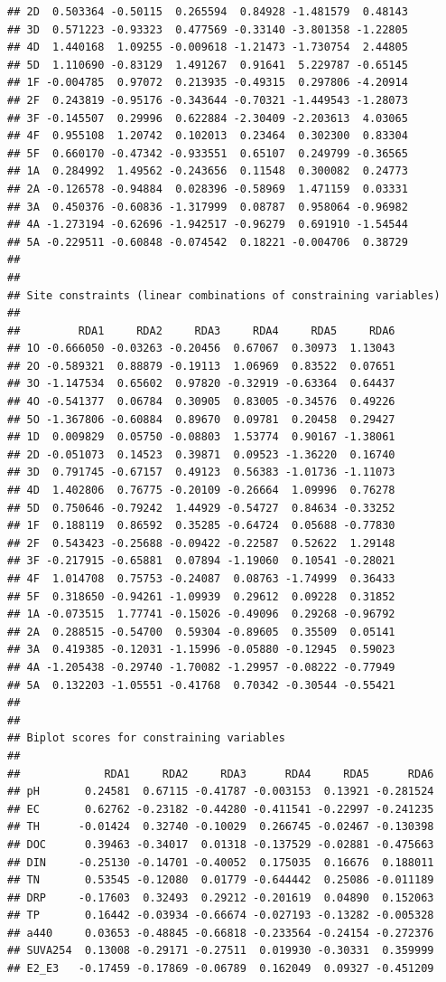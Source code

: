 \documentclass[
]{book}
\begin{document}
\begin{verbatim}
## 2D  0.503364 -0.50115  0.265594  0.84928 -1.481579  0.48143
## 3D  0.571223 -0.93323  0.477569 -0.33140 -3.801358 -1.22805
## 4D  1.440168  1.09255 -0.009618 -1.21473 -1.730754  2.44805
## 5D  1.110690 -0.83129  1.491267  0.91641  5.229787 -0.65145
## 1F -0.004785  0.97072  0.213935 -0.49315  0.297806 -4.20914
## 2F  0.243819 -0.95176 -0.343644 -0.70321 -1.449543 -1.28073
## 3F -0.145507  0.29996  0.622884 -2.30409 -2.203613  4.03065
## 4F  0.955108  1.20742  0.102013  0.23464  0.302300  0.83304
## 5F  0.660170 -0.47342 -0.933551  0.65107  0.249799 -0.36565
## 1A  0.284992  1.49562 -0.243656  0.11548  0.300082  0.24773
## 2A -0.126578 -0.94884  0.028396 -0.58969  1.471159  0.03331
## 3A  0.450376 -0.60836 -1.317999  0.08787  0.958064 -0.96982
## 4A -1.273194 -0.62696 -1.942517 -0.96279  0.691910 -1.54544
## 5A -0.229511 -0.60848 -0.074542  0.18221 -0.004706  0.38729
## 
## 
## Site constraints (linear combinations of constraining variables)
## 
##         RDA1     RDA2     RDA3     RDA4     RDA5     RDA6
## 1O -0.666050 -0.03263 -0.20456  0.67067  0.30973  1.13043
## 2O -0.589321  0.88879 -0.19113  1.06969  0.83522  0.07651
## 3O -1.147534  0.65602  0.97820 -0.32919 -0.63364  0.64437
## 4O -0.541377  0.06784  0.30905  0.83005 -0.34576  0.49226
## 5O -1.367806 -0.60884  0.89670  0.09781  0.20458  0.29427
## 1D  0.009829  0.05750 -0.08803  1.53774  0.90167 -1.38061
## 2D -0.051073  0.14523  0.39871  0.09523 -1.36220  0.16740
## 3D  0.791745 -0.67157  0.49123  0.56383 -1.01736 -1.11073
## 4D  1.402806  0.76775 -0.20109 -0.26664  1.09996  0.76278
## 5D  0.750646 -0.79242  1.44929 -0.54727  0.84634 -0.33252
## 1F  0.188119  0.86592  0.35285 -0.64724  0.05688 -0.77830
## 2F  0.543423 -0.25688 -0.09422 -0.22587  0.52622  1.29148
## 3F -0.217915 -0.65881  0.07894 -1.19060  0.10541 -0.28021
## 4F  1.014708  0.75753 -0.24087  0.08763 -1.74999  0.36433
## 5F  0.318650 -0.94261 -1.09939  0.29612  0.09228  0.31852
## 1A -0.073515  1.77741 -0.15026 -0.49096  0.29268 -0.96792
## 2A  0.288515 -0.54700  0.59304 -0.89605  0.35509  0.05141
## 3A  0.419385 -0.12031 -1.15996 -0.05880 -0.12945  0.59023
## 4A -1.205438 -0.29740 -1.70082 -1.29957 -0.08222 -0.77949
## 5A  0.132203 -1.05551 -0.41768  0.70342 -0.30544 -0.55421
## 
## 
## Biplot scores for constraining variables
## 
##             RDA1     RDA2     RDA3      RDA4     RDA5      RDA6
## pH       0.24581  0.67115 -0.41787 -0.003153  0.13921 -0.281524
## EC       0.62762 -0.23182 -0.44280 -0.411541 -0.22997 -0.241235
## TH      -0.01424  0.32740 -0.10029  0.266745 -0.02467 -0.130398
## DOC      0.39463 -0.34017  0.01318 -0.137529 -0.02881 -0.475663
## DIN     -0.25130 -0.14701 -0.40052  0.175035  0.16676  0.188011
## TN       0.53545 -0.12080  0.01779 -0.644442  0.25086 -0.011189
## DRP     -0.17603  0.32493  0.29212 -0.201619  0.04890  0.152063
## TP       0.16442 -0.03934 -0.66674 -0.027193 -0.13282 -0.005328
## a440     0.03653 -0.48845 -0.66818 -0.233564 -0.24154 -0.272376
## SUVA254  0.13008 -0.29171 -0.27511  0.019930 -0.30331  0.359999
## E2_E3   -0.17459 -0.17869 -0.06789  0.162049  0.09327 -0.451209
\end{verbatim}
\end{document}
